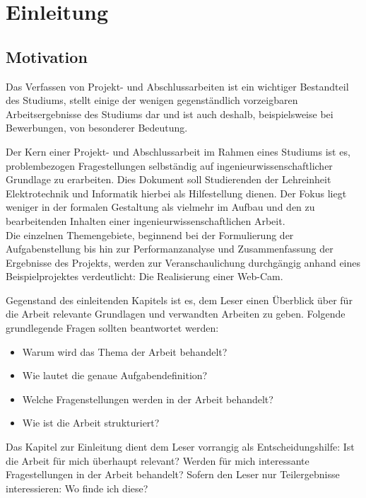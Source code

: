 
\chapter{Einleitung}
\label{sec:Einleitung}

\section{Motivation}
\label{sec:Motivation}

Das Verfassen von Projekt- und Abschlussarbeiten ist ein wichtiger Bestandteil des Studiums, stellt einige der wenigen gegenständlich vorzeigbaren Arbeitsergebnisse des Studiums dar und ist auch deshalb, beispielsweise bei Bewerbungen, von besonderer Bedeutung. 

Der Kern einer Projekt- und Abschlussarbeit im Rahmen eines Studiums ist es, problembezogen Fragestellungen selbständig auf ingenieurwissenschaftlicher Grundlage zu erarbeiten. Dies Dokument soll Studierenden der Lehreinheit Elektrotechnik und Informatik hierbei als Hilfestellung dienen. Der Fokus liegt weniger in der formalen Gestaltung als vielmehr im Aufbau und den zu bearbeitenden Inhalten einer ingenieurwissenschaftlichen Arbeit.\\

Die einzelnen Themengebiete, beginnend bei der Formulierung der Aufgabenstellung bis hin zur Performanzanalyse und Zusammenfassung der Ergebnisse des Projekts, werden zur Veranschaulichung durchgängig anhand eines Beispielprojektes verdeutlicht: Die Realisierung einer Web-Cam.

Gegenstand des einleitenden Kapitels ist es, dem Leser einen Überblick über für die Arbeit relevante Grundlagen und verwandten Arbeiten zu geben. Folgende grundlegende Fragen sollten beantwortet werden:
\begin{itemize}
	\item Warum wird das Thema der Arbeit behandelt? 
	\item Wie lautet die genaue Aufgabendefinition?
	\item Welche Fragenstellungen werden in der Arbeit behandelt?	
	\item Wie ist die Arbeit strukturiert?  
\end{itemize}

Das Kapitel zur Einleitung dient dem Leser vorrangig als Entscheidungshilfe: Ist die Arbeit für mich überhaupt relevant? Werden für mich interessante Fragestellungen in der Arbeit behandelt? Sofern den Leser nur Teilergebnisse interessieren: Wo finde ich diese?

